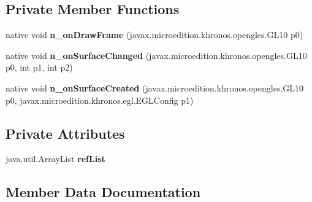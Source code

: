 \subsection*{Private Member Functions}
\begin{DoxyCompactItemize}
\item 
\mbox{\label{classmd5b60ffeb829f638581ab2bb9b1a7f4f3f_1_1OpenGLViewRenderer__Renderer_a3af06f69ccb22603343385f0e693a327}} 
native void {\bfseries n\+\_\+on\+Draw\+Frame} (javax.\+microedition.\+khronos.\+opengles.\+G\+L10 p0)
\item 
\mbox{\label{classmd5b60ffeb829f638581ab2bb9b1a7f4f3f_1_1OpenGLViewRenderer__Renderer_ab404219aa1e0f1148bdd25b396a3786a}} 
native void {\bfseries n\+\_\+on\+Surface\+Changed} (javax.\+microedition.\+khronos.\+opengles.\+G\+L10 p0, int p1, int p2)
\item 
\mbox{\label{classmd5b60ffeb829f638581ab2bb9b1a7f4f3f_1_1OpenGLViewRenderer__Renderer_a87979e2a4ae2dc823ee0edb8db6bf71a}} 
native void {\bfseries n\+\_\+on\+Surface\+Created} (javax.\+microedition.\+khronos.\+opengles.\+G\+L10 p0, javax.\+microedition.\+khronos.\+egl.\+E\+G\+L\+Config p1)
\end{DoxyCompactItemize}
\subsection*{Private Attributes}
\begin{DoxyCompactItemize}
\item 
\mbox{\label{classmd5b60ffeb829f638581ab2bb9b1a7f4f3f_1_1OpenGLViewRenderer__Renderer_af3d20851f4298900dc6d33f721cb582e}} 
java.\+util.\+Array\+List {\bfseries ref\+List}
\end{DoxyCompactItemize}


\subsection{Member Data Documentation}
\mbox{\label{classmd5b60ffeb829f638581ab2bb9b1a7f4f3f_1_1OpenGLViewRenderer__Renderer_a571e71003f6b143de8e407be41c7b3d3}} 
